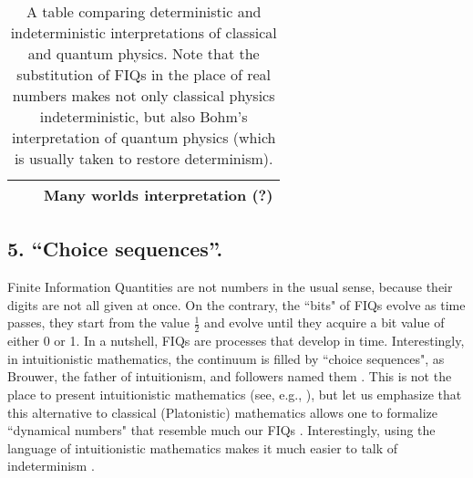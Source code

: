 \documentclass[aps,prl,twocolumn,showpacs,superscriptaddress,groupedaddress, nofootinbib]{revtex4-1}
\begin{document}
\begin{table*}[]
\begin{tabular}{c|c|c|}
\multicolumn{1}{|c|}{}                                 &                                                                                             & Many worlds interpretation (?)                                                                                                                                                       \\ \hline
\end{tabular}

\caption{\small{A table comparing deterministic and indeterministic interpretations of classical and quantum physics. Note that the substitution of FIQs in the place of real numbers makes not only classical physics indeterministic, but also  Bohm's interpretation of quantum physics (which is usually taken to restore determinism).}}
\label{table}
\end{table*}


\subsection{5. ``Choice sequences''.}
Finite Information Quantities are not numbers in the usual sense, because their digits are not all given at once. On the contrary, the ``bits" of FIQs evolve as time passes, they start from the value $\frac{1}{2}$ and evolve until they acquire a bit value of either 0 or 1. In a nutshell, FIQs are processes that develop in time. Interestingly, in intuitionistic mathematics, the continuum is filled by ``choice sequences", as Brouwer, the father of intuitionism, and followers named them \cite{Brouwer1948}. This is not the place to present intuitionistic mathematics (see, e.g., \cite{IndeterminateNumbersPosy}), but let us emphasize that this alternative to classical (Platonistic) mathematics allows one to formalize ``dynamical numbers" that resemble much our FIQs \cite{Troelstra}. Interestingly, using the language of intuitionistic mathematics makes it much easier to talk of indeterminism \cite{NGHiddenReals}.
\end{document}
